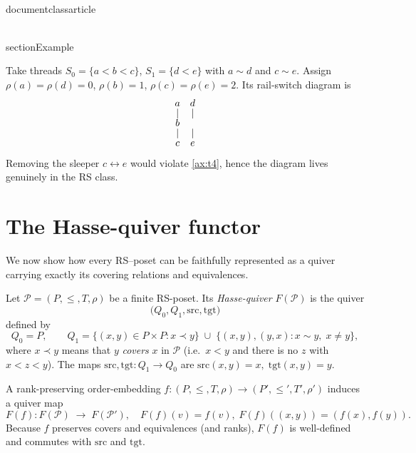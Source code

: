 \\documentclass{article}
\begin{document}
\\section{Example}

Take threads $S_0=\{a<b<c\}$, $S_1=\{d<e\}$ with
$a\sim d$ and $c\sim e$.  Assign $\rho(a)=\rho(d)=0$, $\rho(b)=1$,
$\rho(c)=\rho(e)=2$.  Its rail‑switch diagram is
\[
  \begin{array}{c@{\quad}c}
    a&d\\[-2pt]
    |&|\\[-2pt]
    b&\\[-2pt]
    |&|\\[-2pt]
    c&e
  \end{array}
\]
Removing the sleeper $c\leftrightarrow e$ would violate
\ref{ax:t4}, hence the diagram lives genuinely in the RS class.

\section{The Hasse-quiver functor}\label{sec:hasse-quiver}

We now show how every RS–poset can be faithfully represented as a quiver
carrying exactly its covering relations and equivalences.

\begin{definition}\label{def:hasse-quiver}
Let \(\mathcal P=(P,\le,T,\rho)\) be a finite RS-poset.  Its
\emph{Hasse-quiver} \(F(\mathcal P)\) is the quiver
\[
  \bigl(Q_0,Q_1,\mathrm{src},\mathrm{tgt}\bigr)
\]
defined by
\[
  Q_0 = P,
  \qquad
  Q_1 =
    \bigl\{(x,y)\in P\times P : x\prec y\bigr\}
  \;\cup\;\bigl\{(x,y),(y,x):x\sim y,\;x\neq y\bigr\},
\]
where \(x\prec y\) means that \(y\) \emph{covers} \(x\) in \(\mathcal P\)
(i.e.\ \(x<y\) and there is no \(z\) with \(x<z<y\)).  The maps
\(\mathrm{src},\mathrm{tgt}:Q_1\to Q_0\) are
\(\mathrm{src}(x,y)=x,\;\mathrm{tgt}(x,y)=y\).
\end{definition}

\begin{definition}\label{def:hasse-func}
A rank-preserving order-embedding
\(f\colon(P,\le,T,\rho)\to(P',\le',T',\rho')\) induces a quiver map
\[
  F(f)\colon F(\mathcal P)\;\longrightarrow\;F(\mathcal P'),
  \quad
  F(f)(v)=f(v),\;
  F(f)( (x,y) )=(f(x),f(y)).
\]
Because \(f\) preserves covers and equivalences (and ranks), \(F(f)\)
is well-defined and commutes with \(\mathrm{src}\) and \(\mathrm{tgt}\).
\end{definition}
\end{document}

